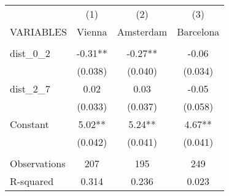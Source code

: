 \begin{tabular}{lccc} \hline
 & (1) & (2) & (3) \\
VARIABLES & Vienna & Amsterdam & Barcelona \\ \hline
 &  &  &  \\
dist\_0\_2 & -0.31** & -0.27** & -0.06 \\
 & (0.038) & (0.040) & (0.034) \\
dist\_2\_7 & 0.02 & 0.03 & -0.05 \\
 & (0.033) & (0.037) & (0.058) \\
Constant & 5.02** & 5.24** & 4.67** \\
 & (0.042) & (0.041) & (0.041) \\
 &  &  &  \\
Observations & 207 & 195 & 249 \\
 R-squared & 0.314 & 0.236 & 0.023 \\ \hline
\end{tabular}
